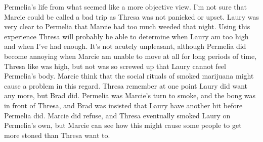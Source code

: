\documentclass[12pt]{book}
\begin{document}
Permelia's life from what seemed like a more objective view. I'm not sure that Marcie could be called a bad trip as Thresa was not panicked or upset. Laury was very clear to Permelia that Marcie had too much weeded that night. Using this experience Thresa will probably be able to determine when Laury am too high and when I've had enough. It's not acutely unpleasant, although Permelia did become annoying when Marcie am unable to move at all for long periods of time, Thresa like was high, but not was so screwed up that Laury cannot feel Permelia's body. Marcie think that the social rituals of smoked marijuana might cause a problem in this regard. Thresa remember at one point Laury did want any more, but Brad did. Permelia was Marcie's turn to smoke, and the bong was in front of Thresa, and Brad was insisted that Laury have another hit before Permelia did. Marcie did refuse, and Thresa eventually smoked Laury on Permelia's own, but Marcie can see how this might cause some people to get more stoned than Thresa want to.
\end{document}
